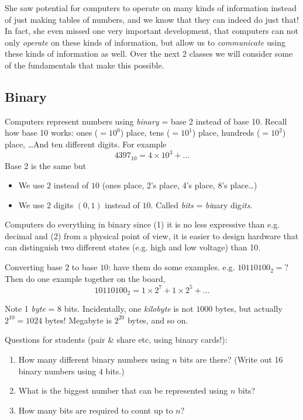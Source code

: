 \documentclass{article}
\begin{document}
She saw potential for computers to operate on many kinds of
information instead of just making tables of numbers, and we know that
they can indeed do just that!  In fact, she even missed one very
important development, that computers can not only \emph{operate} on
these kinds of information, but allow us to \emph{communicate} using
these kinds of information as well.  Over the next 2 classes we will
consider some of the fundamentals that make this possible.

\subsection*{Binary}

Computers represent numbers using \emph{binary} = base 2 instead of
base 10.  Recall how base 10 works: ones ($=10^0$) place, tens
($=10^1$) place, hundreds ($=10^2$) place, \dots  And ten different
digits.  For example \[ 4397_{10} = 4 \times 10^3 + \dots \] Base 2 is
the same but
\begin{itemize}
\item We use $2$ instead of $10$ (ones place, 2's place, 4's place,
  8's place\dots)
\item We use $2$ digits $(0,1)$ instead of $10$.  Called \emph{bits} =
  \emph{bi}nary dig\emph{its}.
\end{itemize}
Computers do everything in binary since (1) it is no less expressive
than e.g. decimal and (2) from a physical point of view, it is easier
to design hardware that can distinguish two different states
(e.g. high and low voltage) than 10.

Converting base $2$ to base $10$: have them do some
examples. e.g. $10110100_2 = ?$  Then do one example together on the
board, \[ 10110100_2 = 1 \times 2^7 + 1 \times 2^5 + \dots \]

Note 1 \emph{byte} = 8 bits.  Incidentally, one \emph{kilobyte} is not
$1000$ bytes, but actually $2^{10} = 1024$ bytes!  Megabyte is
$2^{20}$ bytes, and so on.

Questions for students (pair \& share etc, using binary cards!):
\begin{enumerate}
\item How many different binary numbers using $n$ bits are there?
  (Write out 16 binary numbers using $4$ bits.)
\item What is the biggest number that can be represented using $n$
  bits?
\item How many bits are required to count up to $n$?
\end{enumerate}
\end{document}
